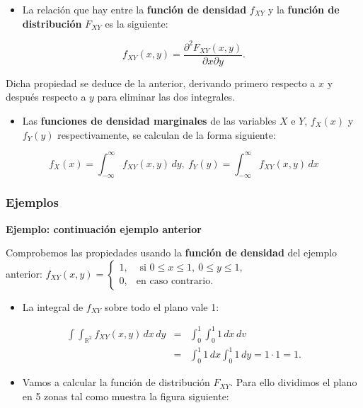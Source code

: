 \documentclass[
  letterpaper,
  DIV=11,
  numbers=noendperiod]{scrreprt}
\providecommand{\tightlist}{%
  \setlength{\itemsep}{0pt}\setlength{\parskip}{0pt}}\usepackage{longtable,booktabs,array}
\begin{document}
\begin{itemize}
\tightlist
\item
  La relación que hay entre la \textbf{función de densidad} \(f_{XY}\) y
  la \textbf{función de distribución} \(F_{XY}\) es la siguiente:
\end{itemize}

\[
f_{XY}(x,y)=\frac{\partial^2 F_{XY}(x,y)}{\partial x\partial y}.
\]

Dicha propiedad se deduce de la anterior, derivando primero respecto a
\(x\) y después respecto a \(y\) para eliminar las dos integrales.

\begin{itemize}
\tightlist
\item
  Las \textbf{funciones de densidad marginales} de las variables \(X\) e
  \(Y\), \(f_X(x)\) y \(f_Y(y)\) respectivamente, se calculan de la
  forma siguiente:
\end{itemize}

\[
f_X(x)=\int_{-\infty}^\infty f_{XY}(x,y)\, dy,\ f_Y(y)=\int_{-\infty}^\infty f_{XY}(x,y)\, dx
\]

\hypertarget{ejemplos-1}{%
\subsubsection{Ejemplos}\label{ejemplos-1}}

\textbf{Ejemplo: continuación ejemplo anterior}

Comprobemos las propiedades usando la \textbf{función de densidad} del
ejemplo anterior:
\(f_{XY}(x,y)=\begin{cases} 1, & \mbox{ si }0\leq x\leq 1,\ 0\leq y\leq 1, \\ 0, & \mbox{en caso contrario.} \end{cases}\)

\begin{itemize}
\tightlist
\item
  La integral de \(f_{XY}\) sobre todo el plano vale 1:
\end{itemize}

\[
\begin{array}{rcl}
\int\int_{\mathbb{R}^2} f_{XY}(x,y)\,dx\, dy &=&\int_0^1\int_0^1 1\, dx\, dv\\
&=&\int_0^1 1\, dx\int_0^1 1\, dy=1\cdot 1=1.
\end{array}
\]

\begin{itemize}
\tightlist
\item
  Vamos a calcular la función de distribución \(F_{XY}\). Para ello
  dividimos el plano en 5 zonas tal como muestra la figura siguiente:
\end{itemize}
\end{document}
